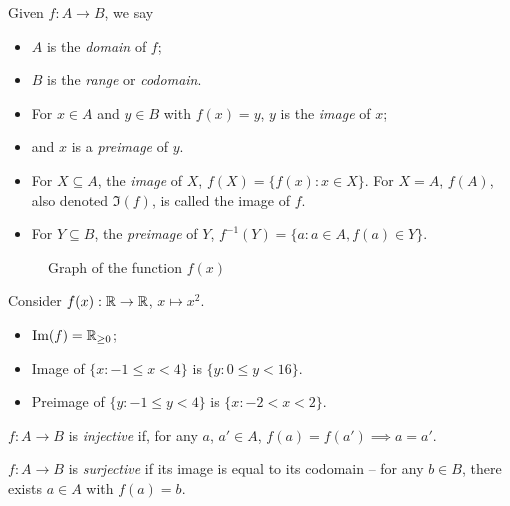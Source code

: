\documentclass{../../template/note}
\begin{document}
    \begin{definition}
        Given \(f: A \to B\), we say
        \begin{itemize}
            \item \(A\) is the \emph{domain} of \(f\);
            \item \(B\) is the \emph{range} or \emph{codomain}.
            \item For \(x \in A\) and \(y \in B\) with \(f(x) = y\), \(y\) is the \emph{image} of \(x\);
            \item and \(x\) is a \emph{preimage} of \(y\).
            \item For \(X \subseteq A\), the \emph{image} of \(X\), \(f(X) = \{f(x): x \in X\}\). For \(X = A\), \(f(A)\), also denoted \(\Im(f)\), is called the image of \(f\).
            \item For \(Y \subseteq B\), the \emph{preimage} of \(Y\), \(f^{-1}(Y) = \{a: a \in A, f(a) \in Y\}\).
        \end{itemize}
    \end{definition}

    \begin{figure}[ht]
            \centering
            \caption{Graph of the function \(f(x)\)}
            \label{fig:x2-function-example}
        \end{figure}

    \begin{example}
        Consider \(f(x): \mathbb R \to \mathbb R\), \(x \mapsto x^2\). 
        \begin{itemize}
            \item \(\operatorname{Im}(f) = \mathbb R_{\geq 0}\);
            \item Image of \(\{x: -1 \leq x < 4\}\) is \(\{y: 0 \leq y < 16\}\).
            \item Preimage of \(\{y: -1 \leq y < 4\}\) is \(\{x: -2 < x < 2\}\).
        \end{itemize}
        
        
        
    \end{example}
    
    \begin{definition}
        \(f: A \to B\) is \emph{injective} if, for any \(a\), \(a' \in A\), \(f(a) = f(a') \implies a = a'\).
    \end{definition}
    
    \begin{definition}
        \(f: A \to B\) is \emph{surjective} if its image is equal to its codomain -- for any \(b \in B\), there exists \(a \in A\) with \(f(a)=b\).
    \end{definition}
    
\end{document}

